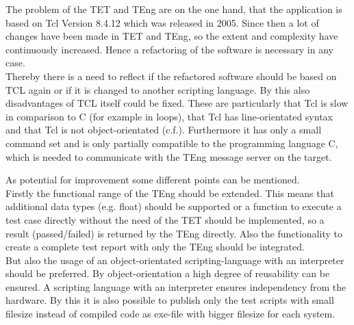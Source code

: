The problem of the TET and TEng are on the one hand, that the application is based on Tcl Version 8.4.12 which was released in 2005. Since then a lot of changes have been made in TET and TEng, so the extent and complexity have continuously increased. Hence a refactoring of the software is necessary in any case. 
\\
Thereby there is a need to reflect if the refactored software should be based on TCL again or if it is changed to another scripting language. By this also disadvantages of TCL itself could be fixed.
These are particularly that Tcl is slow in comparison to C (for example in loops), that Tcl has line-orientated syntax and that Tcl is not object-orientated (c.f.\cite{tclnachteile}). Furthermore it has only a small command set and is only partially compatible to the programming language C, which is needed to communicate with the TEng message server on the target.




As potential for improvement some different points can be mentioned. 
\\
Firstly the functional range of the TEng should be extended. This means that additional  data types (e.g. float) should be supported or a function to execute a test case directly without the need of the TET should be implemented, so a result (passed/failed) is returned by the TEng directly. Also the functionality to create a complete test report with only the TEng should be integrated.
\\
But also the usage of an object-orientated scripting-language with an interpreter should be preferred. By object-orientation a high degree of reusability can be ensured. A scripting language with an interpreter ensures independency from the hardware. By this it is also possible to publish only the test scripts with small filesize instead of compiled code as exe-file with bigger filesize for each system. 






